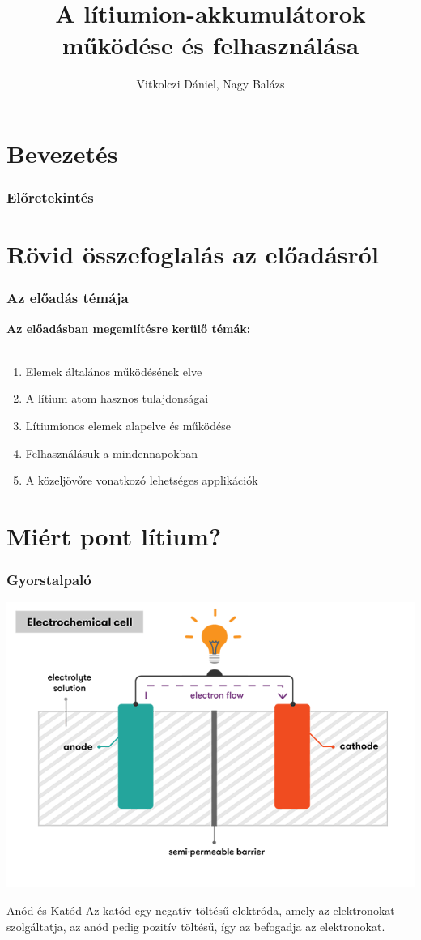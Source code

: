 \documentclass{beamer}
\title{A lítiumion-akkumulátorok működése és felhasználása}
\author{Vitkolczi Dániel, Nagy Balázs}
\date{}
\begin{document}
\section*{Bevezetés}
\begin{frame}
\titlepage
\end{frame}

\begin{frame}
\frametitle{Előretekintés}
\tableofcontents
\end{frame}

\section{Rövid összefoglalás az előadásról}
\begin{frame}
\frametitle{Az előadás témája}
\textbf{Az előadásban megemlítésre kerülő témák:}\\~\\
\begin{enumerate}
	\item<1-> Elemek általános működésének elve
	\item<2-> A lítium atom hasznos tulajdonságai
	\item<3-> Lítiumionos elemek alapelve és működése
	\item<4-> Felhasználásuk a mindennapokban
	\item<5-> A közeljövőre vonatkozó lehetséges applikációk
\end{enumerate}
\end{frame}

\section{Miért pont lítium?}
\begin{frame}
\frametitle{Gyorstalpaló}
\begin{center}
\includegraphics[scale=0.26]{battery}
\end{center}

\begin{block}{Anód és Katód}
	Az katód egy negatív töltésű elektróda, amely az elektronokat szolgáltatja, az anód pedig pozitív töltésű, így az befogadja az elektronokat. 
\end{block}
\end{frame}
\end{document}
